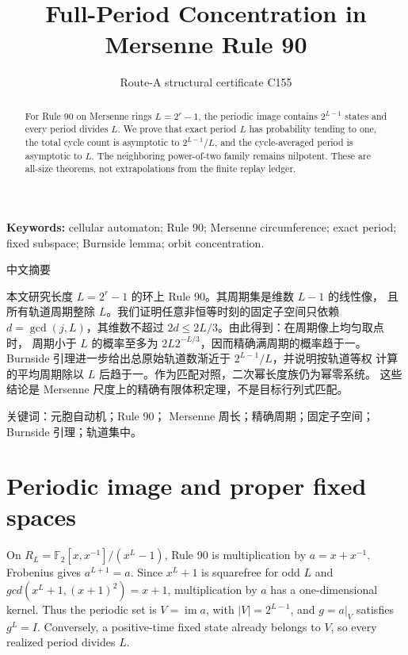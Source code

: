 \documentclass[10pt]{article}
\title{Full-Period Concentration in Mersenne Rule 90}
\author{Route-A structural certificate C155}
\date{}
\begin{document}
\maketitle
\begin{abstract}
For Rule 90 on Mersenne rings $L=2^r-1$, the periodic image contains
$2^{L-1}$ states and every period divides $L$.  We prove that exact period
$L$ has probability tending to one, the total cycle count is asymptotic to
$2^{L-1}/L$, and the cycle-averaged period is asymptotic to $L$.  The
neighboring power-of-two family remains nilpotent.  These are all-size
theorems, not extrapolations from the finite replay ledger.
\end{abstract}
\noindent\textbf{Keywords:} cellular automaton; Rule 90; Mersenne
circumference; exact period; fixed subspace; Burnside lemma; orbit
concentration.

\begin{otherlanguage}{chinese-simplified}
\begin{center}{\large 中文摘要}\end{center}
\begin{sloppypar}
本文研究长度 $L=2^r-1$ 的环上 \foreignlanguage{english}{Rule 90}。其周期集是维数 $L-1$ 的线性像，
且所有轨道周期整除 $L$。我们证明任意非恒等时刻的固定子空间只依赖
$d=\gcd(j,L)$，其维数不超过 $2d\leq2L/3$。由此得到：在周期像上均匀取点时，
周期小于 $L$ 的概率至多为 $2L2^{-L/3}$，因而精确满周期的概率趋于一。
\foreignlanguage{english}{Burnside} 引理进一步给出总原始轨道数渐近于 $2^{L-1}/L$，并说明按轨道等权
计算的平均周期除以 $L$ 后趋于一。作为匹配对照，二次幂长度族仍为幂零系统。
这些结论是 \foreignlanguage{english}{Mersenne} 尺度上的精确有限体积定理，不是目标行列式匹配。
\end{sloppypar}
\noindent 关键词：元胞自动机；\foreignlanguage{english}{Rule 90}；
\foreignlanguage{english}{Mersenne} 周长；精确周期；固定子空间；
\foreignlanguage{english}{Burnside} 引理；轨道集中。
\end{otherlanguage}

\section{Periodic image and proper fixed spaces}
On $R_L=\mathbb F_2[x,x^{-1}]/(x^L-1)$, Rule 90 is multiplication by
$a=x+x^{-1}$.  Frobenius gives $a^{L+1}=a$.  Since $x^L+1$ is squarefree
for odd $L$ and $gcd(x^L+1,(x+1)^2)=x+1$, multiplication by $a$ has a
one-dimensional kernel.  Thus the periodic set is
$V=\operatorname{im}a$, with $|V|=2^{L-1}$, and
$g=a|_V$ satisfies $g^L=I$.  Conversely, a positive-time fixed state already
belongs to $V$, so every realized period divides $L$.
\end{document}
